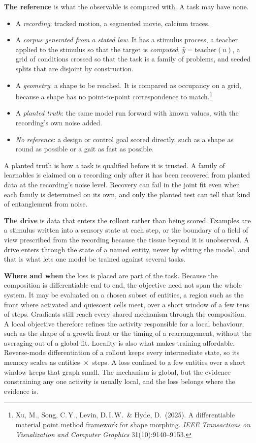 \documentclass[11pt]{article}
\begin{document}
\textbf{The reference} is what the observable is compared with. A task may have none.
\begin{itemize}
\item A \emph{recording}: tracked motion, a segmented movie, calcium traces.
\item A \emph{corpus generated from a stated law}. It has a stimulus process, a teacher
applied to the stimulus so that the target is \emph{computed}, $\hat y=\text{teacher}(u)$,
a grid of conditions crossed so that the task is a family of problems, and seeded splits
that are disjoint by construction.
\item A \emph{geometry}: a shape to be reached. It is compared as occupancy on a grid,
because a shape has no point-to-point correspondence to match.\footnote{Xu, M., Song,
C.\,Y., Levin, D.\,I.\,W.\ \& Hyde, D.\ (2025). A differentiable material point method
framework for shape morphing. \emph{IEEE Transactions on Visualization and Computer
Graphics} 31(10):9140--9153.}
\item A \emph{planted truth}: the same model run forward with known values, with the
recording's own noise added.
\item \emph{No reference}: a design or control goal scored directly, such as a shape as
round as possible or a gait as fast as possible.
\end{itemize}
A planted truth is how a task is qualified before it is trusted. A family of learnables is
claimed on a recording only after it has been recovered from planted data at the
recording's noise level. Recovery can fail in the joint fit even when each family is
determined on its own, and only the planted test can tell that kind of entanglement from
noise.

\textbf{The drive} is data that enters the rollout rather than being scored. Examples are
a stimulus written into a sensory state at each step, or the boundary of a field of view
prescribed from the recording because the tissue beyond it is unobserved. A drive enters
through the state of a named entity, never by editing the model, and that is what lets one
model be trained against several tasks.

\textbf{Where and when} the loss is placed are part of the task. Because the composition is
differentiable end to end, the objective need not span the whole system. It may be
evaluated on a chosen subset of entities, a region such as the front where activated and
quiescent cells meet, over a short window of a few tens of steps. Gradients still reach
every shared mechanism through the composition. A local objective therefore refines the
activity responsible for a local behaviour, such as the shape of a growth front or the
timing of a rearrangement, without the averaging-out of a global fit. Locality is also
what makes training affordable. Reverse-mode differentiation of a rollout keeps every
intermediate state, so its memory scales as entities~$\times$~steps. A loss confined to a
few entities over a short window keeps that graph small. The mechanism is global, but the
evidence constraining any one activity is usually local, and the loss belongs where the
evidence is.
\end{document}
